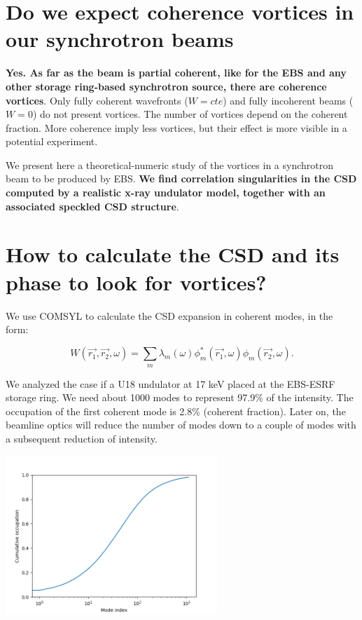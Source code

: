 \documentclass[a4paper,10pt]{article}
\begin{document}
\section{Do we expect coherence vortices in our synchrotron beams}

{\bf Yes. As far as the beam is partial coherent, like for the EBS and any other storage ring-based synchrotron source, there are coherence vortices}. Only fully coherent wavefronts ($W=cte$) and fully incoherent beams ($W=0$) do not present vortices. The number of vortices depend on the coherent fraction. More coherence imply less vortices, but their effect is more visible in a potential experiment. 

We present here a theoretical-numeric study  of the vortices in a synchrotron beam to be produced by EBS. {\bf We find correlation singularities in the CSD computed by a realistic x-ray undulator model, together with an associated speckled CSD structure}.


\section{How to calculate the CSD and its phase to look for vortices?}

We use COMSYL \cite{glass} to calculate the CSD expansion  in coherent modes, in the form:


\begin{equation}
W(\vec{r_1}, \vec{r_2}, \omega)
=
\sum_m
\lambda_m(\omega)
\phi_m^*(\vec{r_1},\omega)
\phi_m(\vec{r_2}, \omega).
\end{equation}

We analyzed the case if a U18 undulator at 17 keV placed at the EBS-ESRF storage ring. We need about 1000 modes to represent 97.9\% of the intensity. The occupation of the first coherent mode is 2.8\% (coherent fraction).  Later on, the beamline optics will reduce the number of modes down to a couple of modes with a subsequent reduction of intensity. 

\includegraphics[width=0.6\textwidth]{Figures/vx_cumulated.png}
\end{document}
